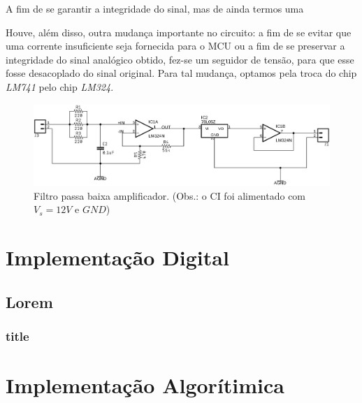 \documentclass[12pt,a4paper]{report}
\begin{document}
		A fim de se garantir a integridade do sinal, mas de ainda termos uma 
		
		Houve, além disso, outra mudança importante no circuito: a fim de se evitar que uma corrente insuficiente seja fornecida para o MCU ou a fim de se preservar a integridade do sinal analógico obtido, fez-se um seguidor de tensão, para que esse fosse desacoplado do sinal original. Para tal mudança, optamos pela troca do chip {\it LM741} pelo chip {\it LM324}.
		
		\begin{figure}[h]
			\includegraphics[width=\linewidth]{test.png}
			\caption{Filtro passa baixa amplificador. (Obs.: o CI foi alimentado com $V_s = 12V$ e $GND$)}
			\label{fig:filter}
		\end{figure}
			
	\chapter{Implementação Digital}
	
	\section{Lorem}
	\subsection{title}
	
	\chapter{Implementação Algorítimica}
	
\end{document}
